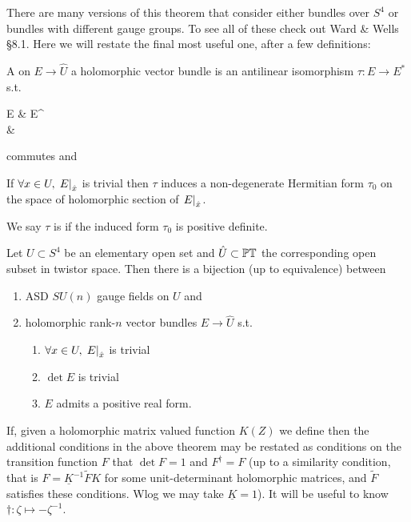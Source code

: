 \documentclass{article}
\begin{document}
There are many versions of this theorem that consider either bundles over $S^4$ or bundles with different gauge groups. To see all of these check out Ward \& Wells \S 8.1. Here we will restate the final most useful one, after a few definitions:

\begin{definition}
	A  on $E \to \hat{U}$ a holomorphic vector bundle is an antilinear isomorphism $\tau:E \to E^\ast$ s.t. 
	\begin{tkz}
		E \arrow[r,"\tau"] \arrow[d] & E^\ast \arrow[d] \\  \arrow[r,"\sigma"] & 
	\end{tkz}
commutes and 
\end{definition}
\begin{lemma}
	If $\forall x \in U, \, \left. E \right\rvert_{\hat{x}}$ is trivial then $\tau$ induces a non-degenerate Hermitian form $\tau_0$ on the space of holomorphic section of $\left. E \right\rvert_{\hat{x}}$. 
\end{lemma}
\begin{definition}
	We say $\tau$ is  if the induced form $\tau_0$ is positive definite. 
\end{definition}
	
\begin{theorem}
	Let $U \subset S^4$ be an elementary open set and $\hat{U}\subset \mathbb{PT}$ the corresponding open subset in twistor space. Then there is a bijection (up to equivalence) between 
	\begin{enumerate}
		\item ASD $SU(n)$ gauge fields on $U$ and 
		\item holomorphic rank-$n$ vector bundles $E \to \hat{U}$ s.t. 
		\begin{enumerate}
			\item $\forall x \in U, \, \left. E \right\rvert_{\hat{x}}$ is trivial
			\item $\det E$ is trivial
			\item $E$ admits a positive real form. 
		\end{enumerate}
	\end{enumerate}
\end{theorem}

\begin{remark}
	If, given a holomorphic matrix valued function $K(Z)$ we define 
then the additional conditions in the above theorem may be restated as conditions on the transition function $F$ that $\det F =1$ and $F^\dagger=F$ (up to a similarity condition, that is $F = \underline{K}^{-1} \tilde{F} K$ for some unit-determinant holomorphic matrices, and $\tilde{F}$ satisfies these conditions. Wlog we may take $\underline{K}=1$). It will be useful to know $\dagger:\zeta \mapsto -\zeta^{-1}$. 
\end{remark}
\end{document}
